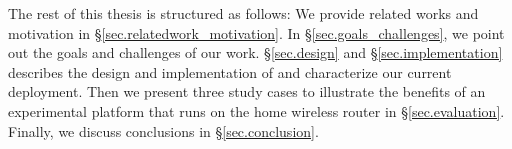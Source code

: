The rest of this thesis is structured as follows: We provide related works and motivation in \S{\ref{sec.relatedwork_motivation}}. In \S{\ref{sec.goals_challenges}}, we point out the goals and challenges of our work. \S{\ref{sec.design}} and \S{\ref{sec.implementation}} describes the design and implementation of \sysname and characterize our current deployment. Then we present three study cases to illustrate the benefits of an experimental platform that runs on the home wireless router in \S{\ref{sec.evaluation}}. Finally, we discuss conclusions in \S{\ref{sec.conclusion}}. 